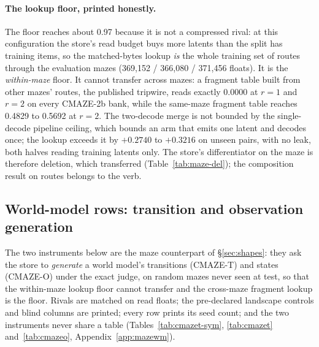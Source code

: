 \documentclass{article} %
\begin{document}
\paragraph{The lookup floor, printed honestly.} The floor reaches about 0.97 because it is not a
compressed rival: at this configuration the store's read budget buys more latents than the split
has training items, so the matched-bytes lookup \emph{is} the whole training set of routes
through the evaluation mazes (369,152 / 366,080 / 371,456 floats). %
It is the \emph{within-maze} floor. It cannot transfer across mazes: a fragment table built from
other mazes' routes, the published tripwire, reads exactly 0.0000 at $r=1$ and $r=2$ on every
CMAZE-2b bank, while the same-maze fragment table reaches 0.4829 to 0.5692 at $r=2$.
The two-decode merge is not bounded by the single-decode pipeline ceiling, which bounds an arm
that emits one latent and decodes once; the lookup exceeds it by $+0.2740$ to $+0.3216$ on
unseen pairs, with no leak, both halves reading training latents only.
The store's differentiator on the maze is therefore deletion, which transferred
(Table~\ref{tab:maze-del}); the composition result on routes belongs to the verb.

\subsection{World-model rows: transition and observation generation}
\label{sec:maze-wm}

The two instruments below are the maze counterpart of \S\ref{sec:shapes}: they ask the store to
\emph{generate} a world model's transitions (CMAZE-T) and states (CMAZE-O) under the exact judge,
on random mazes never seen at test, so that the within-maze lookup floor cannot transfer and the
cross-maze fragment lookup is the floor. Rivals are matched on read floats; the pre-declared
landscape controls and blind columns are printed; every row prints its seed count; and the two
instruments never share a table (Tables~\ref{tab:cmazet-sym}, \ref{tab:cmazet}
and~\ref{tab:cmazeo}, Appendix~\ref{app:mazewm}).
\end{document}
